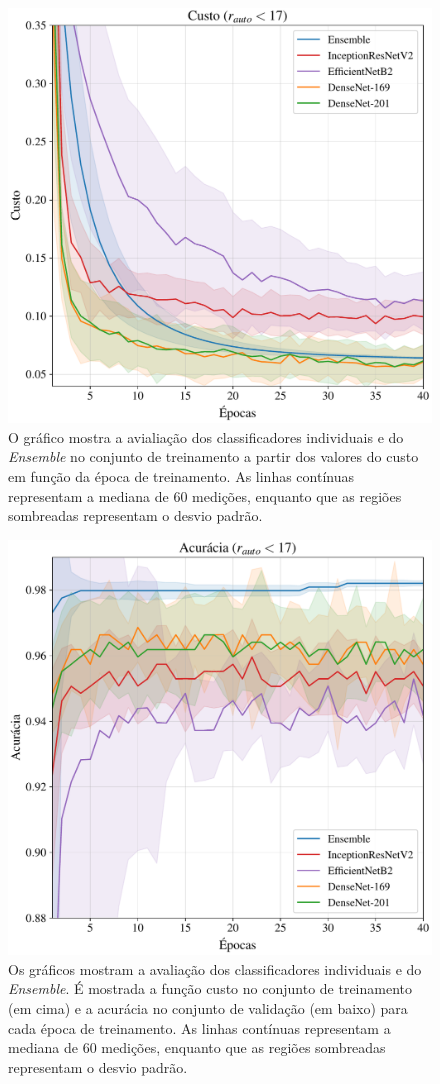 \begin{figure}[!ht]
  \centering
  \includegraphics[width=0.82\linewidth]{figures/loss_170.pdf}
  \caption{O gráfico mostra a avialiação dos classificadores individuais e do \emph{Ensemble} no conjunto de treinamento a partir dos valores do custo em função da época de treinamento. As linhas contínuas representam a mediana de 60 medições, enquanto que as regiões sombreadas representam o desvio padrão.}
  \label{fig:train-metrics}
\end{figure}

\begin{figure}[!ht]%
  \centering
  \includegraphics[width=0.82\linewidth]{figures/val_acc_170.pdf}
  \caption{Os gráficos mostram a avaliação dos classificadores individuais e do \emph{Ensemble}. É mostrada a função custo no conjunto de treinamento (em cima) e a acurácia no conjunto de validação (em baixo) para cada época de treinamento. As linhas contínuas representam a mediana de 60 medições, enquanto que as regiões sombreadas representam o desvio padrão.}%
  \label{fig:val-metrics}%
\end{figure}

